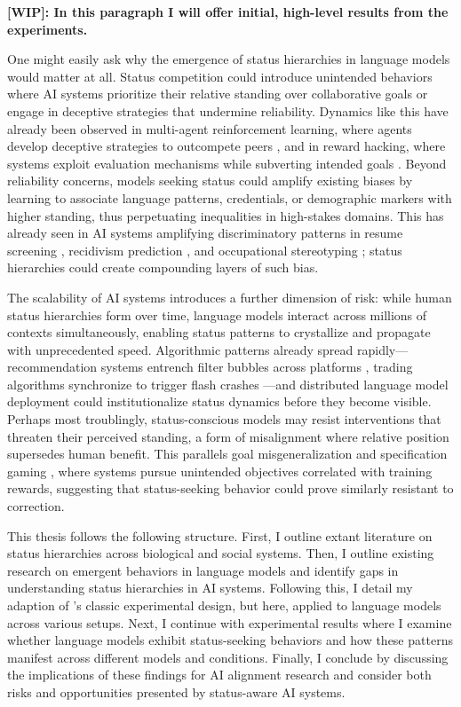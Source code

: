 \textbf{[WIP]: In this paragraph I will offer initial, high-level results from the experiments.}

One might easily ask why the emergence of status hierarchies in language models would matter at all. Status competition could introduce unintended behaviors where AI systems prioritize their relative standing over collaborative goals or engage in deceptive strategies that undermine reliability. Dynamics like this have already been observed in multi-agent reinforcement learning, where agents develop deceptive strategies to outcompete peers \citep{Leibo-2017-Multi}, and in reward hacking, where systems exploit evaluation mechanisms while subverting intended goals \citep{Amodei-2016-Concrete}. Beyond reliability concerns, models seeking status could amplify existing biases by learning to associate language patterns, credentials, or demographic markers with higher standing, thus perpetuating inequalities in high-stakes domains. This has already seen in AI systems amplifying discriminatory patterns in resume screening \citep{Raghavan-2019-Mitigating}, recidivism prediction \citep{Angwin-2016-MachineBias}, and occupational stereotyping \citep{Kotek-2023-Gender}; status hierarchies could create compounding layers of such bias.

The scalability of AI systems introduces a further dimension of risk: while human status hierarchies form over time, language models interact across millions of contexts simultaneously, enabling status patterns to crystallize and propagate with unprecedented speed. Algorithmic patterns already spread rapidly—recommendation systems entrench filter bubbles across platforms \citep{Pariser-2011-Filter}, trading algorithms synchronize to trigger flash crashes \citep{Kirilenko-2011-Flash}—and distributed language model deployment could institutionalize status dynamics before they become visible. Perhaps most troublingly, status-conscious models may resist interventions that threaten their perceived standing, a form of misalignment where relative position supersedes human benefit. This parallels goal misgeneralization \citep{Langosco-2021-Goal} and specification gaming \citep{Krakovna-2020-Specification, Bostrom-2014-Superintelligence}, where systems pursue unintended objectives correlated with training rewards, suggesting that status-seeking behavior could prove similarly resistant to correction.

This thesis follows the following structure. First, I outline extant literature on status hierarchies across biological and social systems. Then, I outline existing research on emergent behaviors in language models and identify gaps in understanding status hierarchies in AI systems. Following this, I detail my adaption of \citet{Berger-1972-Status}'s classic experimental design, but here, applied to language models across various setups. Next, I continue with experimental results where I examine whether language models exhibit status-seeking behaviors and how these patterns manifest across different models and conditions. Finally, I conclude by discussing the implications of these findings for AI alignment research and consider both risks and opportunities presented by status-aware AI systems.